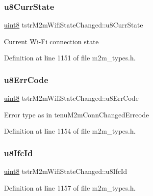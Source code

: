 \subsubsection{\texorpdfstring{u8\+Curr\+State}{u8CurrState}}
{\footnotesize\ttfamily \hyperlink{group__DataT_ga4df709a77647e870bbf1d955b8edc9a6}{uint8} tstr\+M2m\+Wifi\+State\+Changed\+::u8\+Curr\+State}

Current Wi-\/\+Fi connection state 

Definition at line 1151 of file m2m\+\_\+types.\+h.

\mbox{\label{structtstrM2mWifiStateChanged_a6eec99c8a4c5c0c0db084dfe571507eb}} 
\subsubsection{\texorpdfstring{u8\+Err\+Code}{u8ErrCode}}
{\footnotesize\ttfamily \hyperlink{group__DataT_ga4df709a77647e870bbf1d955b8edc9a6}{uint8} tstr\+M2m\+Wifi\+State\+Changed\+::u8\+Err\+Code}

Error type as in tenu\+M2m\+Conn\+Changed\+Errcode 

Definition at line 1154 of file m2m\+\_\+types.\+h.

\mbox{\label{structtstrM2mWifiStateChanged_a51cd59eb757ed24fcbc2dc7e3a0facfb}} 
\subsubsection{\texorpdfstring{u8\+Ifc\+Id}{u8IfcId}}
{\footnotesize\ttfamily \hyperlink{group__DataT_ga4df709a77647e870bbf1d955b8edc9a6}{uint8} tstr\+M2m\+Wifi\+State\+Changed\+::u8\+Ifc\+Id}



Definition at line 1157 of file m2m\+\_\+types.\+h.

\mbox{\label{structtstrM2mWifiStateChanged_ac466e48d4812e1b44633f1607d024a1b}} 
